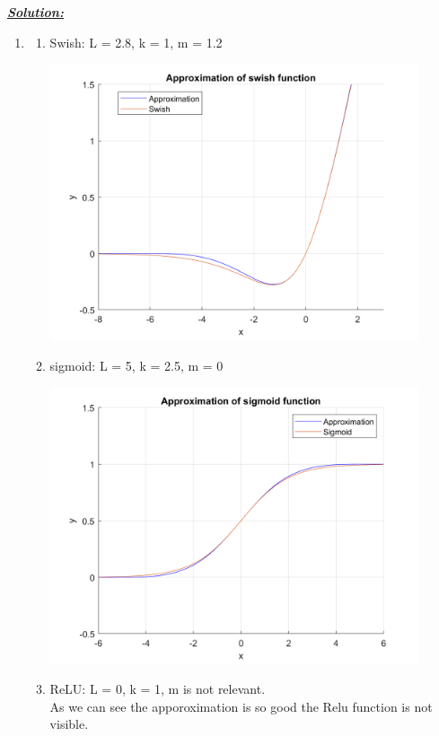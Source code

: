 \documentclass{article}
\begin{document}
\noindent \underline{\textbf{\textit{Solution:}}}

\begin{enumerate}[label=\Alph*]
  \item 
  \begin{enumerate}
  \item Swish: L = 2.8, k = 1, m = 1.2
  \begin{center} \includegraphics[width=0.9\textwidth]{Problem7_swish.png} \end{center}
  \item sigmoid: L = 5, k = 2.5, m = 0
  \begin{center} \includegraphics[width=0.9\textwidth]{Problem7_sigmoid.png} \end{center}
  \item ReLU: L = 0, k = 1, m is not relevant. \\ As we can see the apporoximation is so good the Relu function is not visible.

\end{enumerate}
\end{enumerate}
\end{document}
